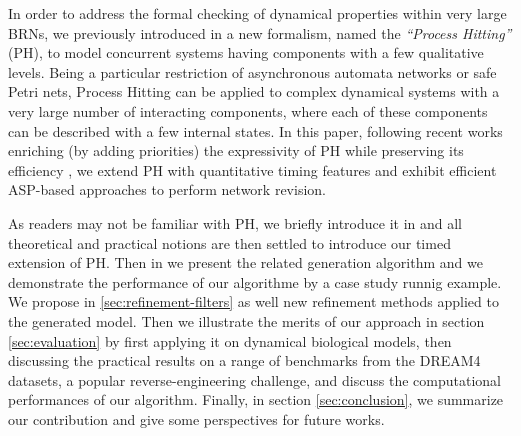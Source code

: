 In order to address the formal checking of dynamical properties within very large BRNs, we previously introduced in \cite{PMR10-TCSB} a new formalism, named the \emph{``Process Hitting''} (PH), to model concurrent systems having components with a few qualitative levels. Being a particular restriction of asynchronous automata networks or safe Petri nets, Process Hitting can be applied to complex dynamical systems with a very large number of interacting components, where each of these components can be described with a few internal states. In this paper, following recent works enriching (by adding priorities) the expressivity of PH while preserving its efficiency \cite{folschette2013under}, we extend PH with quantitative timing features and exhibit efficient ASP-based approaches to perform network revision. 

As readers may not be familiar with PH, we briefly introduce it in  and all theoretical and practical notions are then settled to introduce our timed extension of PH. Then in   we present the related generation algorithm and we demonstrate the performance of our algorithme by a case study runnig example. We propose in \ref{sec:refinement-filters} as well new refinement methods applied to the generated model. Then we illustrate the merits of our approach in section \ref{sec:evaluation} by first applying it on dynamical biological models, then discussing the practical results on a range of benchmarks from the DREAM4 datasets, a popular reverse-engineering challenge, and discuss the computational performances of our algorithm. Finally, in section \ref{sec:conclusion}, we summarize our contribution and give some perspectives for future works. 


